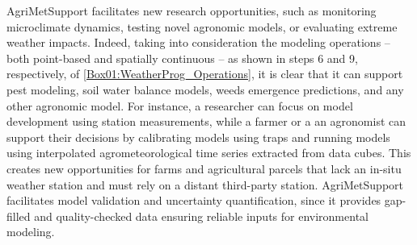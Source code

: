 \documentclass[authoryear,preprint,review,12pt]{elsarticle}
\begin{document}
AgriMetSupport facilitates new research opportunities, such as monitoring microclimate dynamics, testing novel agronomic models, or evaluating extreme weather impacts. %
Indeed, taking into consideration the modeling operations -- both point-based and spatially continuous -- as shown in steps 6 and 9, respectively, of \cref{Box01:WeatherProg_Operations}, it is clear that it can support pest modeling, soil water balance models, weeds emergence predictions, and any other agronomic model.
For instance, a researcher can focus on model development using station measurements, while a farmer or a an  agronomist can support their decisions by calibrating models using traps and running models using interpolated agrometeorological time series extracted from data cubes.
This creates new opportunities for farms and agricultural parcels that lack an in-situ weather station and must rely on a distant third-party station.
AgriMetSupport facilitates model validation and uncertainty quantification, since it provides gap-filled and quality-checked data ensuring reliable inputs for environmental modeling.

\end{document}
